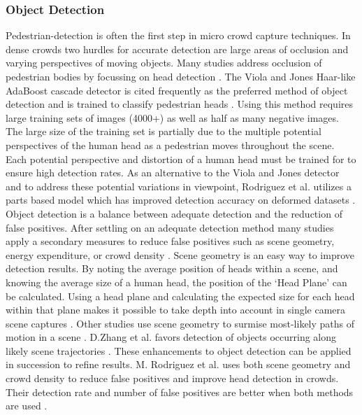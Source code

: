 \documentclass[12pt, onecolumn, conference]{IEEEtran}
\begin{document}
\subsubsection{Object Detection}

Pedestrian-detection is often the first step in micro crowd capture techniques. In dense crowds two hurdles for accurate detection are large areas of occlusion and varying perspectives of moving objects. Many studies address occlusion of pedestrian bodies by focussing on head detection \cite{M. Rodriguez}\cite{D. Zhang}\cite{I. Ali}\cite{I. Ali2}. The Viola and Jones Haar-like AdaBoost cascade detector is cited frequently as the preferred method of object detection and is trained to classify pedestrian heads \cite{D. Zhang}\cite{I. Ali}\cite{I. Ali2}. Using this method requires large training sets of images (4000+) as well as half as many negative images. The large size of the training set is partially due to the multiple potential perspectives of the human head as a pedestrian moves throughout the scene. Each potential perspective and distortion of a human head must be trained for to ensure high detection rates. As an alternative to the Viola and Jones detector and to address these potential variations in viewpoint, Rodriguez et al. utilizes a parts based model which has improved detection accuracy on deformed datasets \cite{D. Forsyth}.
Object detection is a balance between adequate detection and the reduction of false positives. After settling on an adequate detection method many studies apply a secondary measures to reduce false positives such as scene geometry, energy expenditure, or crowd density \cite{M. Rodriguez}\cite{D. Zhang}\cite{I. Ali}\cite{I. Ali2}. Scene geometry is an easy way to improve detection results. By noting the average position of heads within a scene, and knowing the average size of a human head, the position of the ‘Head Plane’ can be calculated. Using a head plane and calculating the expected size for each head within that plane makes it possible to take depth into account in single camera scene captures \cite{M. Rodriguez}\cite{I. Ali2}.  Other studies use scene geometry to surmise most-likely paths of motion in a scene \cite{M. Rodriguez}\cite{D. Zhang}.  D.Zhang et al. favors detection of objects occurring along likely scene trajectories \cite{D. Zhang}. 
These enhancements to object detection can be applied in succession to refine results. M. Rodriguez et al. uses both scene geometry and crowd density to reduce false positives and improve head detection in crowds. Their detection rate and number of false positives are better when both methods are used \cite{M. Rodriguez}. 
\end{document}
